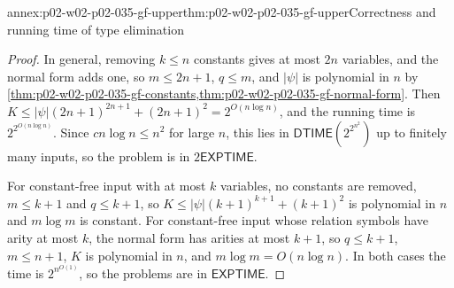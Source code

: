 \begin{annexitem}{annex:p02-w02-p02-035-gf-upper}{thm:p02-w02-p02-035-gf-upper}{Correctness and running time of type elimination}
\begin{proof}
In general, removing \(k\leq n\) constants gives at most \(2n\) variables, and
the normal form adds one, so \(m\leq2n+1\), \(q\leq m\), and
\(\lvert\psi\rvert\) is polynomial in \(n\) by
\cref{thm:p02-w02-p02-035-gf-constants,thm:p02-w02-p02-035-gf-normal-form}.
Then \(K\leq\lvert\psi\rvert(2n+1)^{2n+1}+(2n+1)^2=2^{O(n\log n)}\), and the
running time is \(2^{2^{O(n\log n)}}\).  Since \(cn\log n\leq n^2\) for large
\(n\), this lies in \(\mathsf{DTIME}(2^{2^{n^2}})\) up to finitely many
inputs, so the problem is in \(2\mathsf{EXPTIME}\).

For constant-free input with at most \(k\) variables, no constants are
removed, \(m\leq k+1\) and \(q\leq k+1\), so \(K\leq\lvert\psi\rvert(k+1)^{k+1}+(k+1)^2\)
is polynomial in \(n\) and \(m\log m\) is constant.  For constant-free input
whose relation symbols have arity at most \(k\), the normal form has
arities at most \(k+1\), so \(q\leq k+1\), \(m\leq n+1\), \(K\) is polynomial
in \(n\), and \(m\log m=O(n\log n)\).  In both cases the time is
\(2^{n^{O(1)}}\), so the problems are in \(\mathsf{EXPTIME}\).
\end{proof}
\end{annexitem}

